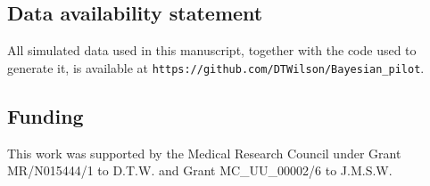 \documentclass[AMA,STIX1COL]{WileyNJD-v2}
\begin{document}



\subsection*{Data availability statement}

All simulated data used in this manuscript, together with the code used to generate it, is available at \nolinkurl{https://github.com/DTWilson/Bayesian_pilot}.

\subsection*{Funding}

This work was supported by the Medical Research Council under Grant MR/N015444/1 to D.T.W. and Grant MC\_UU\_00002/6 to J.M.S.W.

%

\end{document}
